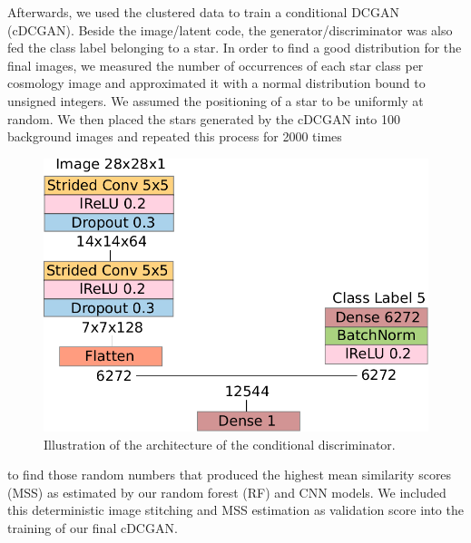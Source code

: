 \documentclass[10pt,conference,compsocconf]{IEEEtran}
\begin{document}
Afterwards, we used the clustered data to train a conditional DCGAN (cDCGAN). Beside the image/latent code, the generator/discriminator was also fed the class label belonging to a star. In order to find a good distribution for the final images, we measured the number of occurrences of each star class per cosmology image and approximated it with a normal distribution bound to unsigned integers. We assumed the positioning of a star to be uniformly at random. We then placed the stars generated by the cDCGAN into \SI{100}{} background images and repeated this process for \SI{2000}{} times 

\begin{figure}[hb]
    \centering
    \includegraphics[width=0.73\columnwidth]{assets/cdis_arch.pdf}
    \caption{Illustration of the architecture of the conditional discriminator.}
    \label{fig:cdis_arch}
\end{figure}

to find those random numbers that produced the highest mean similarity scores (MSS) as estimated by our random forest (RF) and CNN models. We included this deterministic image stitching and MSS estimation as validation score into the training of our final cDCGAN.

\end{document}

